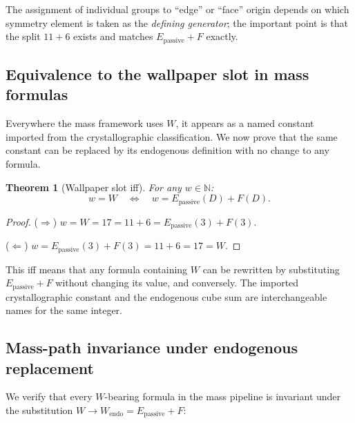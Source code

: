 \documentclass[11pt,a4paper]{article}
\newtheorem{theorem}{Theorem}[section]
\theoremstyle{definition}
\theoremstyle{remark}
\newcommand{\Epass}{E_{\mathrm{passive}}}
\begin{document}
\noindent
The assignment of individual groups to ``edge'' or ``face'' origin depends on
which symmetry element is taken as the \emph{defining generator}; the
important point is that the split $11 + 6$ exists and matches
$\Epass + F$ exactly.

\subsection{Equivalence to the wallpaper slot in mass formulas}

Everywhere the mass framework uses $W$, it appears as a named constant
imported from the crystallographic classification.  We now prove that the
same constant can be replaced by its endogenous definition with no change
to any formula.

\begin{theorem}[Wallpaper slot iff]
\label{thm:wallpaper_iff}
For any $w \in \mathbb{N}$:
\begin{equation}
  w = W \quad\Longleftrightarrow\quad
  w = \Epass(D) + F(D).
  \label{eq:W_iff}
\end{equation}
\end{theorem}

\begin{proof}
($\Rightarrow$)\; $w = W = 17 = 11 + 6 = \Epass(3) + F(3)$.

($\Leftarrow$)\; $w = \Epass(3) + F(3) = 11 + 6 = 17 = W$.
\end{proof}

\noindent
This iff means that any formula containing $W$ can be rewritten by
substituting $\Epass + F$ without changing its value, and conversely.
The imported crystallographic constant and the endogenous cube sum are
interchangeable names for the same integer.

\subsection{Mass-path invariance under endogenous replacement}

We verify that every $W$-bearing formula in the mass pipeline is invariant
under the substitution $W \to W_{\mathrm{endo}} = \Epass + F$:
\end{document}
